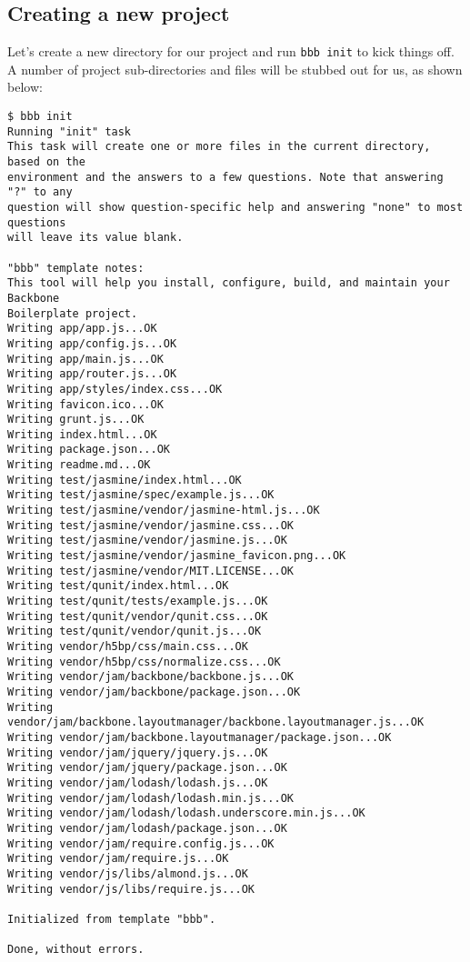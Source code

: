 \documentclass[9pt]{book}
\begin{document}
\subsection{Creating a new project}\label{creating-a-new-project}

Let's create a new directory for our project and run \texttt{bbb init}
to kick things off. A number of project sub-directories and files will
be stubbed out for us, as shown below:

\begin{verbatim}
$ bbb init
Running "init" task
This task will create one or more files in the current directory, based on the
environment and the answers to a few questions. Note that answering "?" to any
question will show question-specific help and answering "none" to most questions
will leave its value blank.

"bbb" template notes:
This tool will help you install, configure, build, and maintain your Backbone
Boilerplate project.
Writing app/app.js...OK
Writing app/config.js...OK
Writing app/main.js...OK
Writing app/router.js...OK
Writing app/styles/index.css...OK
Writing favicon.ico...OK
Writing grunt.js...OK
Writing index.html...OK
Writing package.json...OK
Writing readme.md...OK
Writing test/jasmine/index.html...OK
Writing test/jasmine/spec/example.js...OK
Writing test/jasmine/vendor/jasmine-html.js...OK
Writing test/jasmine/vendor/jasmine.css...OK
Writing test/jasmine/vendor/jasmine.js...OK
Writing test/jasmine/vendor/jasmine_favicon.png...OK
Writing test/jasmine/vendor/MIT.LICENSE...OK
Writing test/qunit/index.html...OK
Writing test/qunit/tests/example.js...OK
Writing test/qunit/vendor/qunit.css...OK
Writing test/qunit/vendor/qunit.js...OK
Writing vendor/h5bp/css/main.css...OK
Writing vendor/h5bp/css/normalize.css...OK
Writing vendor/jam/backbone/backbone.js...OK
Writing vendor/jam/backbone/package.json...OK
Writing vendor/jam/backbone.layoutmanager/backbone.layoutmanager.js...OK
Writing vendor/jam/backbone.layoutmanager/package.json...OK
Writing vendor/jam/jquery/jquery.js...OK
Writing vendor/jam/jquery/package.json...OK
Writing vendor/jam/lodash/lodash.js...OK
Writing vendor/jam/lodash/lodash.min.js...OK
Writing vendor/jam/lodash/lodash.underscore.min.js...OK
Writing vendor/jam/lodash/package.json...OK
Writing vendor/jam/require.config.js...OK
Writing vendor/jam/require.js...OK
Writing vendor/js/libs/almond.js...OK
Writing vendor/js/libs/require.js...OK

Initialized from template "bbb".

Done, without errors.
\end{verbatim}
\end{document}
